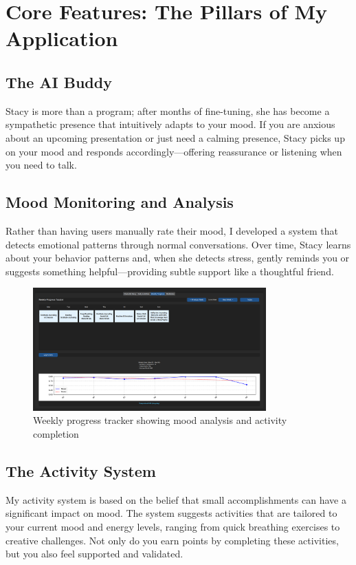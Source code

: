 \documentclass[12pt]{article}
\begin{document}
\section{Core Features: The Pillars of My Application}

\subsection{The AI Buddy}
Stacy is more than a program; after months of fine-tuning, she has become a sympathetic presence that intuitively adapts to your mood. If you are anxious about an upcoming presentation or just need a calming presence, Stacy picks up on your mood and responds accordingly—offering reassurance or listening when you need to talk.

\subsection{Mood Monitoring and Analysis}
Rather than having users manually rate their mood, I developed a system that detects emotional patterns through normal conversations. Over time, Stacy learns about your behavior patterns and, when she detects stress, gently reminds you or suggests something helpful—providing subtle support like a thoughtful friend.

\begin{figure}[H]
  \centering
  \includegraphics[width=0.8\textwidth]{../images/Progress-Tracker.png}
  \caption{Weekly progress tracker showing mood analysis and activity completion}
\end{figure}

\subsection{The Activity System}
My activity system is based on the belief that small accomplishments can have a significant impact on mood. The system suggests activities that are tailored to your current mood and energy levels, ranging from quick breathing exercises to creative challenges. Not only do you earn points by completing these activities, but you also feel supported and validated.
\end{document}
